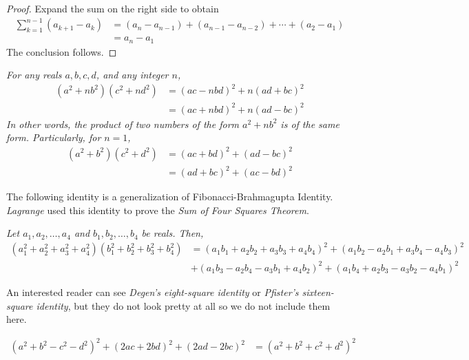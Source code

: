 \documentclass[main.tex]{subfile}
\begin{document}
\begin{appendix}
	\begin{proof}
		Expand the sum on the right side to obtain
			\begin{align*}
				\sum_{k=1}^{n-1} \left(a_{k+1} - a_{k}\right)
					&=  \left(a_{n} - a_{n-1}\right) +  \left(a_{n-1} - a_{n-2}\right) + \cdots +  \left(a_{2} - a_{1}\right)\\
					&= a_n - a_1
			\end{align*}
		The conclusion follows.
	\end{proof}


	\begin{identity}\slshape\label{id:fibbr}
		For any reals $a,b,c,d$, and any integer $n$,
		\begin{align*}
			(a^2+nb^2)(c^2+nd^2)&=(ac-nbd)^2+n(ad+bc)^2\\
			&=(ac+nbd)^2+n(ad-bc)^2
		\end{align*}
		In other words, the product of two numbers of the form $a^2+nb^2$ is of the same form. Particularly, for $n=1$,
		\begin{align*}
			(a^2+b^2)(c^2+d^2)&=(ac+bd)^2+(ad-bc)^2\\
			&=(ad+bc)^2+(ac-bd)^2
		\end{align*}
	\end{identity}

	The following identity is a generalization of Fibonacci-Brahmagupta Identity. \textit{Lagrange} used this identity to prove the \textit{Sum of Four Squares Theorem}.

	\begin{identity}\slshape\label{id:foursqr}
		Let $a_1,a_2,\ldots,a_4$ and $b_1,b_2,\ldots,b_4$ be reals. Then,
		\begin{align*}
			(a_1^2+a_2^2+a_3^2+a_4^2)(b_1^2+b_2^2+b_3^2+b_4^2)
				& =(a_1 b_1 + a_2 b_2 + a_3 b_3 + a_4 b_4)^2 +(a_1 b_2 - a_2 b_1 + a_3 b_4 - a_4 b_3)^2\\
				& +(a_1 b_3 - a_2 b_4 - a_3 b_1 + a_4 b_2)^2 +(a_1 b_4 + a_2 b_3 - a_3 b_2 - a_4 b_1)^2
		\end{align*}
	\end{identity}
	An interested reader can see \textit{Degen's eight-square identity} or \textit{Pfister's sixteen-square identity}, but they do not look pretty at all so we do not include them here.

	\begin{identity}\slshape\label{id:lebesgue}
		\begin{align*}
			(a^2+b^2-c^2-d^2)^2 + (2ac+2bd)^2 + (2ad-2bc)^2 & = (a^2+b^2+c^2+d^2)^2
		\end{align*}
	\end{identity}


\end{appendix}
\end{document}
